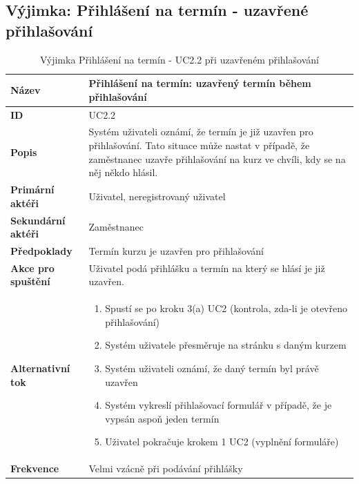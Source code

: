 \documentclass[12pt,a4paper,titlepage,final]{report}
\begin{document}
\subsection{Výjimka: Přihlášení na termín - uzavřené přihlašování}
\begin{table}[!h]
	\begin{center}
    \begin{tabular}{ | p{4.2cm} | p{12.2cm} | }
    \hline
    \textbf{Název} & Přihlášení na termín: uzavřený termín během přihlašování
    \\ \hline
    
	\textbf{ID} & UC2.2
	\\ \hline
	
	\textbf{Popis} & Systém uživateli oznámí, že termín je již uzavřen pro přihlašování. Tato situace může nastat v případě, že zaměstnanec uzavře přihlašování na kurz ve chvíli, kdy se na něj někdo hlásil.
	\\ \hline
	    
	\textbf{Primární aktéři} & Uživatel, neregistrovaný uživatel
	\\ \hline
	
	\textbf{Sekundární aktéři} & Zaměstnanec   
	\\ \hline
	
	\textbf{Předpoklady} & Termín kurzu je uzavřen pro přihlašování
    \\ \hline    
        
    \textbf{Akce pro spuštění} & Uživatel podá přihlášku a termín na který se hlásí je již uzavřen.
    \\ \hline
    
    \textbf{Alternativní tok} & 
    \vspace{-3.5mm}
	\begin{enumerate}
        \itemsep0em 	
		\item Spustí se po kroku 3(a) UC2 (kontrola, zda-li je otevřeno přihlašování)
		\item Systém uživatele přesměruje na stránku s daným kurzem
		\item Systém uživateli oznámí, že daný termín byl právě uzavřen
		\item Systém vykreslí přihlašovací formulář v případě, že je vypsán aspoň jeden termín
		\item Uživatel pokračuje krokem 1 UC2 (vyplnění formuláře)
	\end{enumerate}	     
    \\ \hline    
    
	\textbf{Frekvence} & Velmi vzácně při podávání přihlášky
	\\ \hline
	\end{tabular}
		\caption{Výjimka Přihlášení na termín - UC2.2 při uzavřeném přihlašování}
	\end{center}

\end{table}
\end{document}
